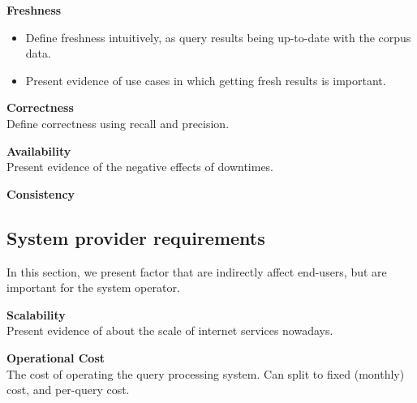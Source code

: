 \textbf{Freshness}
\begin{itemize}
  \item Define freshness intuitively, as query results being up-to-date with the corpus data.
  \item Present evidence of use cases in which getting fresh results is important.
\end{itemize}

\textbf{Correctness} \\
  Define correctness using recall and precision.

\textbf{Availability} \\
  Present evidence of the negative effects of downtimes.

\textbf{Consistency}

\subsection{System provider requirements}
In this section, we present factor that are indirectly affect end-users, but are important for the system operator.

\textbf{Scalability} \\
Present evidence of about the scale of internet services nowadays.

\textbf{Operational Cost} \\
The cost of operating the query processing system. Can split to fixed (monthly) cost, and per-query cost.

